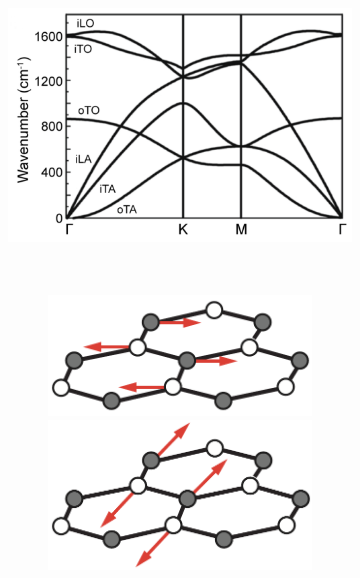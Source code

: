 \begin{figure}[!h]
  \centering
  \begin{subfigure}[t]{0.7\textwidth}
    \caption{}
    \includegraphics[width=\textwidth]{./images/phonon-modes.png}
  \end{subfigure}
  ~
  \begin{subfigure}[t]{0.25\textwidth}
    \begin{subfigure}[t]{\textwidth}
      \centering
      \caption{}
      \includegraphics[width=\textwidth]{./images/g-mode-phonon.pdf}
      \includegraphics[width=\textwidth]{./images/g-mode-phonon-2.pdf}

\end{subfigure}
\end{subfigure}
\end{figure}
